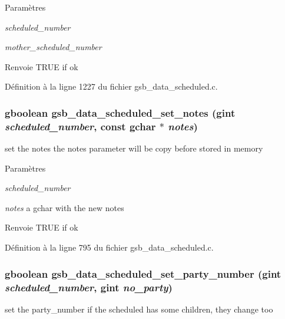 \begin{DoxyParams}{Paramètres}
\item[{\em scheduled\_\-number}]\item[{\em mother\_\-scheduled\_\-number}]\end{DoxyParams}
\begin{DoxyReturn}{Renvoie}
TRUE if ok 
\end{DoxyReturn}


Définition à la ligne 1227 du fichier gsb\_\-data\_\-scheduled.c.

\subsubsection[{gsb\_\-data\_\-scheduled\_\-set\_\-notes}]{\setlength{\rightskip}{0pt plus 5cm}gboolean gsb\_\-data\_\-scheduled\_\-set\_\-notes (gint {\em scheduled\_\-number}, \/  const gchar $\ast$ {\em notes})}\label{gsb__data__scheduled_8c_aeb1f51ee0889bf8736e7ab914e0aeec1}
set the notes the notes parameter will be copy before stored in memory


\begin{DoxyParams}{Paramètres}
\item[{\em scheduled\_\-number}]\item[{\em notes}]a gchar with the new notes\end{DoxyParams}
\begin{DoxyReturn}{Renvoie}
TRUE if ok 
\end{DoxyReturn}


Définition à la ligne 795 du fichier gsb\_\-data\_\-scheduled.c.

\subsubsection[{gsb\_\-data\_\-scheduled\_\-set\_\-party\_\-number}]{\setlength{\rightskip}{0pt plus 5cm}gboolean gsb\_\-data\_\-scheduled\_\-set\_\-party\_\-number (gint {\em scheduled\_\-number}, \/  gint {\em no\_\-party})}\label{gsb__data__scheduled_8c_a91c6d9659e496ece4de95ce4fbc24f25}
set the party\_\-number if the scheduled has some children, they change too


